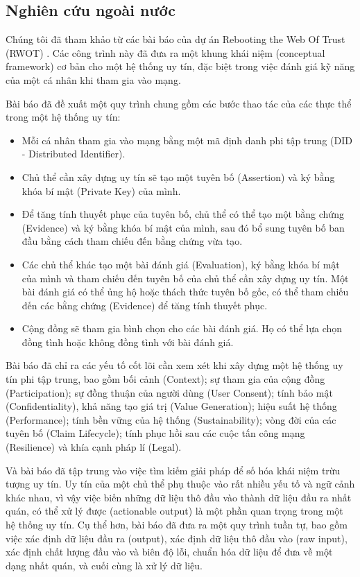 \subsection{Nghiên cứu ngoài nước}

Chúng tôi đã tham khảo từ các bài báo của dự án Rebooting the Web Of Trust (RWOT) \cite{reputation-toolkit, reputation-design, reputation-interpretation}.
Các công trình này đã đưa ra một khung khái niệm (conceptual framework) cơ bản cho một hệ thống uy tín, đặc biệt trong việc đánh giá kỹ năng của một cá nhân khi tham gia vào mạng.

Bài báo \cite{reputation-toolkit} đã đề xuất một quy trình chung gồm các bước thao tác của các thực thể trong một hệ thống uy tín:
\begin{itemize}
  \item Mỗi cá nhân tham gia vào mạng bằng một mã định danh phi tập trung (DID - Distributed Identifier).
  \item Chủ thể cần xây dựng uy tín sẽ tạo một tuyên bố (Assertion) và ký bằng khóa bí mật (Private Key) của mình.
  \item Để tăng tính thuyết phục của tuyên bố, chủ thể có thể tạo một bằng chứng (Evidence) và ký bằng khóa bí mật của mình, sau đó bổ sung tuyên bố ban đầu bằng cách tham chiếu đến bằng chứng vừa tạo.
  \item Các chủ thể khác tạo một bài đánh giá (Evaluation), ký bằng khóa bí mật của mình và tham chiếu đến tuyên bố của chủ thể cần xây dựng uy tín. Một bài đánh giá có thể ủng hộ hoặc thách thức tuyên bố gốc, có thể tham chiếu đến các bằng chứng (Evidence) để tăng tính thuyết phục.
  \item Cộng đồng sẽ tham gia bình chọn cho các bài đánh giá. Họ có thể lựa chọn đồng tình hoặc không đồng tình với bài đánh giá.
\end{itemize}
Bài báo \cite{reputation-design} đã chỉ ra các yếu tố cốt lõi cần xem xét khi xây dựng một hệ thống uy tín phi tập trung, bao gồm bối cảnh (Context);
sự tham gia của cộng đồng (Participation); sự đồng thuận của người dùng (User Consent); tính bảo mật (Confidentiality), khả năng tạo giá trị (Value Generation);
hiệu suất hệ thống (Performance); tính bền vững của hệ thống (Sustainability); vòng đời của các tuyên bố (Claim Lifecycle); tính phục hồi sau các cuộc tấn công mạng (Resilience) và khía cạnh pháp lí (Legal).

Và bài báo \cite{reputation-interpretation} đã tập trung vào việc tìm kiếm giải pháp để số hóa khái niệm trừu tượng uy tín.
Uy tín của một chủ thể phụ thuộc vào rất nhiều yếu tố và ngữ cảnh khác nhau, vì vậy việc biến những dữ liệu thô đầu vào thành dữ liệu đầu ra nhất quán,
có thể xử lý được (actionable output) là một phần quan trọng trong một hệ thống uy tín. Cụ thể hơn, bài báo đã đưa ra một quy trình tuần tự, bao gồm việc xác định dữ liệu đầu ra (output),
xác định dữ liệu thô đầu vào (raw input), xác định chất lượng đầu vào và biên độ lỗi, chuẩn hóa dữ liệu để đưa về một dạng nhất quán, và cuối cùng là xử lý dữ liệu.

